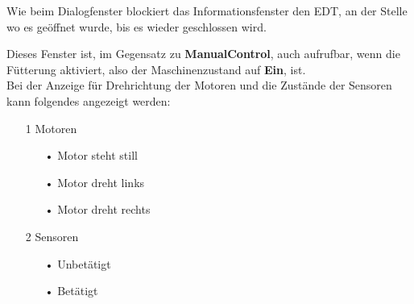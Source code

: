 \vspace{10pt}

Wie beim Dialogfenster blockiert das Informationsfenster den EDT, an der Stelle wo es geöffnet wurde, bis es wieder geschlossen wird.

\vspace{10pt}

Dieses Fenster ist, im Gegensatz zu \textbf{ManualControl}, auch aufrufbar, wenn die Fütterung aktiviert, also der Maschinenzustand auf \textbf{Ein}, ist.
\\ Bei der Anzeige für Drehrichtung der Motoren und die Zustände der Sensoren kann folgendes angezeigt werden:
\begin{itemize}
\item[1] Motoren
  \begin{itemize}
    \item[•] Motor steht still
    \item[•] Motor dreht links
    \item[•] Motor dreht rechts
  \end{itemize}
\item[2] Sensoren
  \begin{itemize}
    \item[•] Unbetätigt 
    \item[•] Betätigt 
  \end{itemize}
\end{itemize}

\vspace{10pt}

